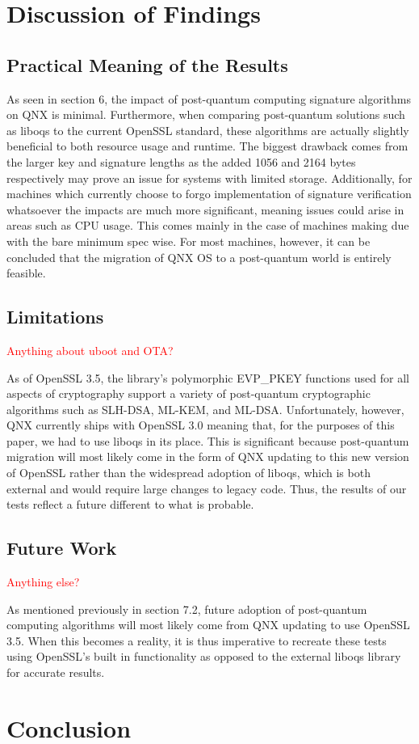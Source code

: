 \documentclass[12pt]{article}
\begin{document}
\section{Discussion of Findings}
\subsection{Practical Meaning of the Results}
As seen in section 6, the impact of post-quantum computing signature algorithms on QNX is minimal. Furthermore, when comparing post-quantum solutions such as liboqs to the current OpenSSL standard, these algorithms are actually slightly beneficial to both resource usage and runtime. The biggest drawback comes from the larger key and signature lengths as the added 1056 and 2164 bytes respectively may prove an issue for systems with limited storage. Additionally, for machines which currently choose to forgo implementation of signature verification whatsoever the impacts are much more significant, meaning issues could arise in areas such as CPU usage. This comes mainly in the case of machines making due with the bare minimum spec wise. For most machines, however, it can be concluded that the migration of QNX OS to a post-quantum world is entirely feasible. 
\subsection{Limitations}
\textcolor{red}{Anything about uboot and OTA?}

As of OpenSSL 3.5, the library's polymorphic EVP\_PKEY functions used for all aspects of cryptography support a variety of post-quantum cryptographic algorithms such as SLH-DSA, ML-KEM, and ML-DSA. Unfortunately, however, QNX currently ships with OpenSSL 3.0 meaning that, for the purposes of this paper, we had to use liboqs in its place. This is significant because post-quantum migration will most likely come in the form of QNX updating to this new version of OpenSSL rather than the widespread adoption of liboqs, which is both external and would require large changes to legacy code. Thus, the results of our tests reflect a future different to what is probable.
\subsection{Future Work}
\textcolor{red}{Anything else?}

As mentioned previously in section 7.2, future adoption of post-quantum computing algorithms will most likely come from QNX updating to use OpenSSL 3.5. When this becomes a reality, it is thus imperative to recreate these tests using OpenSSL's built in functionality as opposed to the external liboqs library for accurate results. 
\section{Conclusion}
\end{document}
